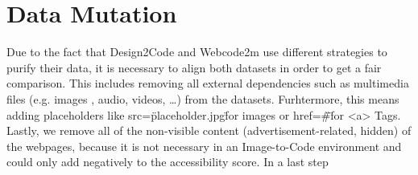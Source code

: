 \section{Data Mutation}
Due to the fact that Design2Code and Webcode2m use different strategies to purify
their data, it is necessary to align both datasets in order to get a fair comparison.
This includes removing all external dependencies such as multimedia files (e.g. images
, audio, videos, {\ldots}) from the datasets. Furhtermore, this means adding 
placeholders like src=\"placeholder.jpg\" for images or href=\"\#\" for <a> Tags.
Lastly, we remove all of the non-visible content (advertisement-related, hidden) 
of the webpages, because it is not necessary in an Image-to-Code environment and 
could only add negatively to the accessibility score.\newline
In a last step

